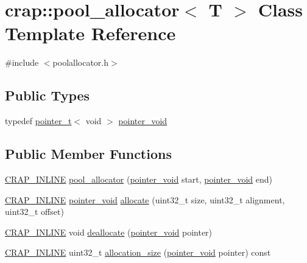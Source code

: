 \hypertarget{classcrap_1_1pool__allocator}{\section{crap\+:\+:pool\+\_\+allocator$<$ T $>$ Class Template Reference}
\label{classcrap_1_1pool__allocator}
}


{\ttfamily \#include $<$poolallocator.\+h$>$}

\subsection*{Public Types}
\begin{DoxyCompactItemize}
\item 
typedef \hyperlink{structcrap_1_1pointer__t}{pointer\+\_\+t}$<$ void $>$ \hyperlink{classcrap_1_1pool__allocator_a017b14f47ade2415878807d9f28fddce}{pointer\+\_\+void}
\end{DoxyCompactItemize}
\subsection*{Public Member Functions}
\begin{DoxyCompactItemize}
\item 
\hyperlink{config__x86_8h_a5a40526b8d842e7ff731509998bb0f1c}{C\+R\+A\+P\+\_\+\+I\+N\+L\+I\+N\+E} \hyperlink{classcrap_1_1pool__allocator_aae6bc00997872aa1a1507665f33cfe86}{pool\+\_\+allocator} (\hyperlink{classcrap_1_1pool__allocator_a017b14f47ade2415878807d9f28fddce}{pointer\+\_\+void} start, \hyperlink{classcrap_1_1pool__allocator_a017b14f47ade2415878807d9f28fddce}{pointer\+\_\+void} end)
\item 
\hyperlink{config__x86_8h_a5a40526b8d842e7ff731509998bb0f1c}{C\+R\+A\+P\+\_\+\+I\+N\+L\+I\+N\+E} \hyperlink{classcrap_1_1pool__allocator_a017b14f47ade2415878807d9f28fddce}{pointer\+\_\+void} \hyperlink{classcrap_1_1pool__allocator_ab0c964f5ebcac28ac4c722349635bdce}{allocate} (uint32\+\_\+t size, uint32\+\_\+t alignment, uint32\+\_\+t offset)
\item 
\hyperlink{config__x86_8h_a5a40526b8d842e7ff731509998bb0f1c}{C\+R\+A\+P\+\_\+\+I\+N\+L\+I\+N\+E} void \hyperlink{classcrap_1_1pool__allocator_aa4bfc41f084c92eb23ffaca9426bb6aa}{deallocate} (\hyperlink{classcrap_1_1pool__allocator_a017b14f47ade2415878807d9f28fddce}{pointer\+\_\+void} pointer)
\item 
\hyperlink{config__x86_8h_a5a40526b8d842e7ff731509998bb0f1c}{C\+R\+A\+P\+\_\+\+I\+N\+L\+I\+N\+E} uint32\+\_\+t \hyperlink{classcrap_1_1pool__allocator_ac893d4803503d82f2717e8f18d49bef6}{allocation\+\_\+size} (\hyperlink{classcrap_1_1pool__allocator_a017b14f47ade2415878807d9f28fddce}{pointer\+\_\+void} pointer) const 
\end{DoxyCompactItemize}


